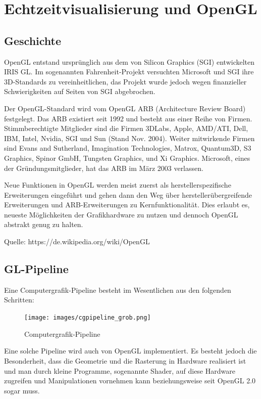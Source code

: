 \section{Echtzeitvisualisierung und OpenGL}
\subsection{Geschichte}
OpenGL entstand ursprünglich aus dem von Silicon Graphics (SGI) entwickelten IRIS GL. Im sogenannten Fahrenheit-Projekt versuchten Microsoft und SGI ihre 3D-Standards zu vereinheitlichen, das Projekt wurde jedoch wegen finanzieller Schwierigkeiten auf Seiten von SGI abgebrochen.

Der OpenGL-Standard wird vom OpenGL ARB (Architecture Review Board) festgelegt. Das ARB existiert seit 1992 und besteht aus einer Reihe von Firmen. Stimmberechtigte Mitglieder sind die Firmen 3DLabs, Apple, AMD/ATI, Dell, IBM, Intel, Nvidia, SGI und Sun (Stand Nov. 2004). Weiter mitwirkende Firmen sind Evans and Sutherland, Imagination Technologies, Matrox, Quantum3D, S3 Graphics, Spinor GmbH, Tungsten Graphics, und Xi Graphics. Microsoft, eines der Gründungsmitglieder, hat das ARB im März 2003 verlassen.

Neue Funktionen in OpenGL werden meist zuerst als herstellerspezifische Erweiterungen eingeführt und gehen dann den Weg über herstellerübergreifende Erweiterungen und ARB-Erweiterungen zu Kernfunktionalität. Dies erlaubt es, neueste Möglichkeiten der Grafikhardware zu nutzen und dennoch OpenGL abstrakt genug zu halten.

Quelle: https://de.wikipedia.org/wiki/OpenGL
\subsection{GL-Pipeline}
Eine Computergrafik-Pipeline besteht im Wesentlichen aus den folgenden Schritten:
\begin{figure}[H]
    \centering
    \texttt{[image: images/cgpipeline\_grob.png]}
    \caption{Computergrafik-Pipeline}
    \label{fig:cdpipeline-overview}
\end{figure}


Eine solche Pipeline wird auch von OpenGL implementiert. Es besteht jedoch die Besonderheit, dass die Geometrie und die  Rasterung in Hardware realisiert ist und man durch kleine Programme, sogenannte Shader, auf diese Hardware zugreifen und Manipulationen vornehmen kann beziehungsweise seit OpenGL 2.0 sogar muss.

